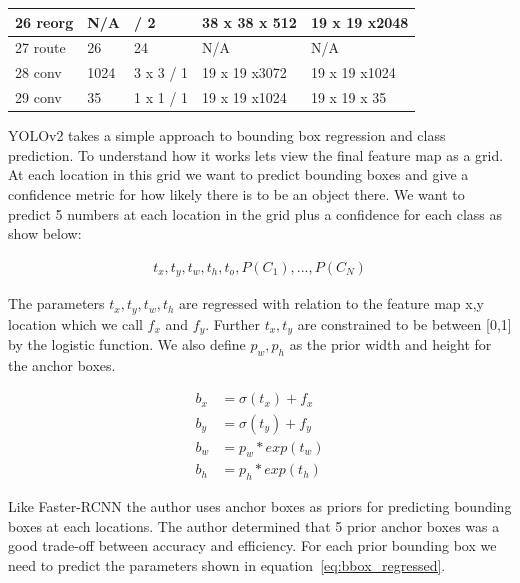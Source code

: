 \begin{center}
\begin{table}[h]
\begin{tabular}{| l | l | l | l | l |}
   \rowcolor{Tan}
   26 reorg & N/A &            / 2      & 38 x  38 x 512    &    19 x  19 x2048 \\ \hline

   \rowcolor{LightGreen}
   27 route & 26 & 24 & N/A & N/A \\ \hline \hline

    \rowcolor{LightCyan}
   28 conv &   1024  & 3 x 3 / 1   & 19 x  19 x3072    &    19 x  19 x1024 \\ \hline

    \rowcolor{LightCyan}
   29 conv &     35  & 1 x 1 / 1   & 19 x  19 x1024    &    19 x  19 x  35 \\ \hline

    \hline
    \end{tabular}
\end{table}
\end{center}

YOLOv2 takes a simple approach to bounding box regression and class prediction. To understand how it works lets view the final feature map as a grid. At each location in this grid we want to predict bounding boxes and give a confidence metric for how likely there is to be an object there. We want to predict 5 numbers at each location in the grid plus a confidence for each class as show below:

\begin{align}\label{eq:bbox_regressed}
    t_x,t_y,t_w,t_h,t_o,P(C_1),...,P(C_N)
\end{align}

The parameters $t_x,t_y,t_w,t_h$ are regressed with relation to the feature map x,y location which we call $f_x$ and $f_y$. Further $t_x,t_y$ are constrained to be between [0,1] by the logistic function. We also define $p_w,p_h$ as the prior width and height for the anchor boxes.


\begin{align}
    b_x &= \sigma(t_x) + f_x \\
    b_y &= \sigma(t_y) + f_y \\
    b_w &= p_w * exp(t_w) \\
    b_h &= p_h * exp(t_h)
\end{align}

Like Faster-RCNN the author uses anchor boxes as priors for predicting bounding boxes at each locations. The author determined that 5 prior anchor boxes was a good trade-off between accuracy and efficiency. For each prior bounding box we need to predict the parameters shown in equation~\ref{eq:bbox_regressed}.

